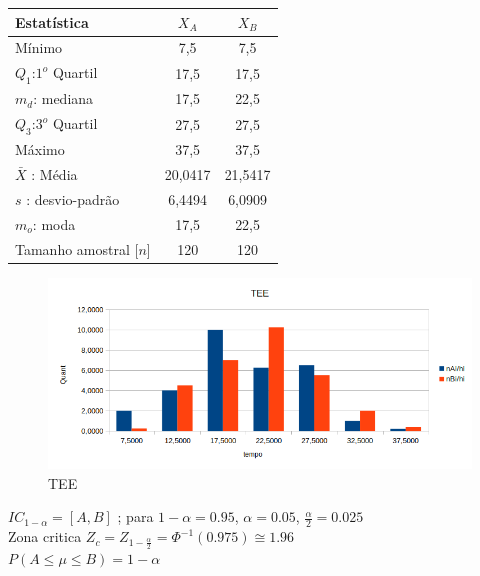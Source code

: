 \newline
\begin{minipage}[!b]{0.40\linewidth}
	\begin{tabular}{ l c c }
		\hline
		Estatística & $X_A$ & $X_B$ \\
		\hline
		Mínimo & 7,5 & 7,5\\
		$Q_1$:$1^o$ Quartil & 17,5 & 17,5 \\
		$m_d$: mediana & 17,5 & 22,5\\
		$Q_3$:$3^o$ Quartil & 27,5 & 27,5 \\
		Máximo & 37,5 & 37,5 \\
		\hline
		$\bar{X}$ : Média & 20,0417 & 21,5417 \\
		$s$ : desvio-padrão & 6,4494 & 6,0909\\
		$m_o$: moda & 17,5 & 22,5\\
		\hline
		Tamanho amostral [$n$] & 120 & 120 \\
		\hline
	\end{tabular}
	\label{Tab:Resultados}
\end{minipage}
\hspace{2cm}
\begin{minipage}[!b]{0.40\linewidth}
	\begin{figure}[H]
		\centering
		\includegraphics[scale=0.5]{./image/ESTAT/TEE.png}
		\caption{TEE}
		\label{TEE}
	\end{figure}
\end{minipage}
$IC_{1-\alpha}=\left[ A, B\right]$ ; para $1-\alpha = 0.95$, $\alpha=0.05$, $\frac{\alpha}{2}=0.025$ \\
Zona critica $Z_c=Z_{1-\frac{\alpha}{2}}=\Phi^{-1}(0.975) \cong 1.96$ \\
$P\left( A \leqslant \mu \leqslant B \right) = 1-\alpha$ \\

